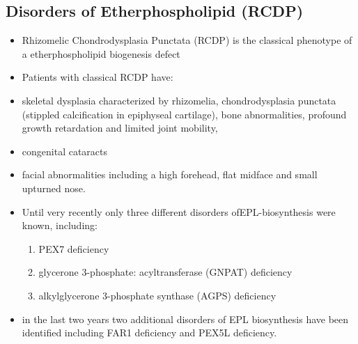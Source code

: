 \documentclass{scrartcl}
\begin{document}
\subsection{Disorders of Etherphospholipid (RCDP)}
\label{sec:org732b171}
\begin{itemize}
\item Rhizomelic Chondrodysplasia Punctata (RCDP) is the classical
phenotype of a etherphospholipid biogenesis defect

\item Patients with classical RCDP have:
\item skeletal dysplasia characterized by rhizomelia, chondrodysplasia punctata (stippled calcification in epiphyseal cartilage), bone abnormalities, profound growth retardation and limited joint mobility,
\item congenital cataracts
\item facial abnormalities including a high forehead, flat midface and small upturned nose.
\item Until very recently only three different disorders ofEPL-biosynthesis were known, including:
\begin{enumerate}
\item PEX7 deficiency

\item glycerone 3-phosphate: acyltransferase (GNPAT) deficiency

\item alkylglycerone 3-phosphate synthase (AGPS) deficiency
\end{enumerate}

\item in the last two years two additional disorders of EPL biosynthesis have been identified including FAR1 deficiency and PEX5L deficiency.
\end{itemize}
\end{document}
